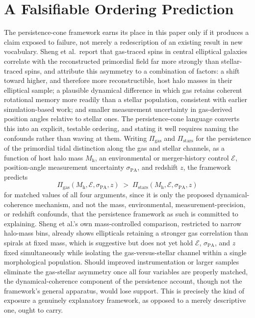 \documentclass[11pt]{article}
\begin{document}
\section{A Falsifiable Ordering Prediction}

The persistence-cone framework earns its place in this paper only if it produces a claim exposed to failure, not merely a redescription of an existing result in new vocabulary. Sheng et al.\ report that gas-traced spins in central elliptical galaxies correlate with the reconstructed primordial field far more strongly than stellar-traced spins, and attribute this asymmetry to a combination of factors: a shift toward higher, and therefore more reconstructible, host halo masses in their elliptical sample; a plausible dynamical difference in which gas retains coherent rotational memory more readily than a stellar population, consistent with earlier simulation-based work; and smaller measurement uncertainty in gas-derived position angles relative to stellar ones. The persistence-cone language converts this into an explicit, testable ordering, and stating it well requires naming the confounds rather than waving at them. Writing $\Pi_{\mathrm{gas}}$ and $\Pi_{\mathrm{stars}}$ for the persistence of the primordial tidal distinction along the gas and stellar channels, as a function of host halo mass $M_{\mathrm h}$, an environmental or merger-history control $\mathcal E$, position-angle measurement uncertainty $\sigma_{\mathrm{PA}}$, and redshift $z$, the framework predicts
\begin{equation}
\Pi_{\mathrm{gas}}(M_{\mathrm h}, \mathcal E, \sigma_{\mathrm{PA}}, z) \;>\; \Pi_{\mathrm{stars}}(M_{\mathrm h}, \mathcal E, \sigma_{\mathrm{PA}}, z)
\end{equation}
for matched values of all four arguments, since it is only the proposed dynamical-coherence mechanism, and not the mass, environmental, measurement-precision, or redshift confounds, that the persistence framework as such is committed to explaining. Sheng et al.'s own mass-controlled comparison, restricted to narrow halo-mass bins, already shows ellipticals retaining a stronger gas correlation than spirals at fixed mass, which is suggestive but does not yet hold $\mathcal E$, $\sigma_{\mathrm{PA}}$, and $z$ fixed simultaneously while isolating the gas-versus-stellar channel within a single morphological population. Should improved instrumentation or larger samples eliminate the gas-stellar asymmetry once all four variables are properly matched, the dynamical-coherence component of the persistence account, though not the framework's general apparatus, would lose support. This is precisely the kind of exposure a genuinely explanatory framework, as opposed to a merely descriptive one, ought to carry.
\end{document}

